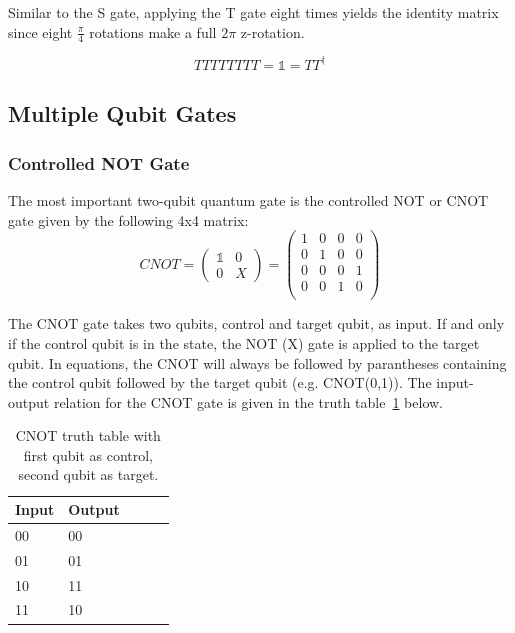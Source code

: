Similar to the S gate, applying the T gate eight times yields the identity matrix since eight $\frac{\pi}{4}$ rotations make a full $2\pi$ z-rotation.

\begin{equation}
TTTTTTTT = \mathbb{1} = TT^\dagger
\end{equation}

\subsection{Multiple Qubit Gates}
\label{subsubsec:multiqubitgates}

\subsubsection{Controlled NOT Gate}
\label{subsubsubsec:cnotgate}

The most important two-qubit quantum gate is the controlled NOT or CNOT gate given by the following 4x4 matrix:
\begin{equation}
CNOT = \begin{pmatrix}
 \mathbb{1} & 0 \\ 
 0 & X
 \end{pmatrix} = \begin{pmatrix}
 1 & 0 & 0 & 0 \\ 
 0 & 1 & 0 & 0 \\
 0 & 0 & 0 & 1 \\
 0 & 0 & 1 & 0 \\
 \end{pmatrix}
\end{equation}

The CNOT gate takes two qubits, control and target qubit, as input. If and only if the control qubit is in the \1 state, the NOT (X) gate is applied to the target qubit. In equations, the CNOT will always be followed by parantheses containing the control qubit followed by the target qubit (e.g. CNOT(0,1)). The input-output relation for the CNOT gate is given in the truth table~\ref{tab:cnottruthtable} below.

\begin{table}[ht!]
\begin{center}
\caption{CNOT truth table with first qubit as control, second qubit as target.}\vspace{1ex}
\label{tab:cnottruthtable}
\begin{tabular}{llccc}\hline
Input & Output \\ \hline
00 & 00 \\
01 & 01 \\
10 & 11 \\
11 & 10 \\ \hline
\end{tabular}
\end{center}
\end{table}

